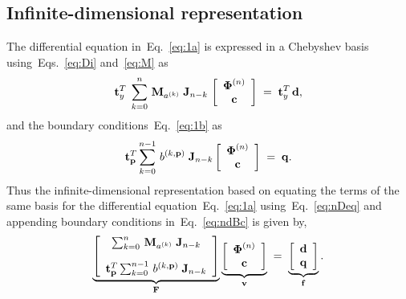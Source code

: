 \documentclass[%
secnumarabic,%
 amssymb, amsmath,%
 aps,prf,superscriptaddress,longbibliography
frontmatterverbose,
]{revtex4-2}
\begin{document}
\subsection{Infinite-dimensional representation}
The differential equation in~Eq.~\eqref{eq:1a} is expressed in a Chebyshev basis using~Eqs.~\eqref{eq:Di} and~\eqref{eq:M} as 
\begin{equation}\label{eq:nDeq}
  \mathbf{t}_{y}^T\;\sum_{k = 0}^{n}\, \mathbf M_{a^{(k)}}\; \mathbf{J}_{n-k}\,\left[\begin{array}{c}
    \boldsymbol \Phi^{(n)}\\ \mathbf{c} \end{array}\right] \;=\; \mathbf{t}_{y}^T\,\mathbf{d},
\end{equation}
and the boundary conditions~Eq.~\eqref{eq:1b} as
\begin{equation}\label{eq:ndBc}
  \mathbf{t}_{\mathbf{p}}^T\sum_{k = 0}^{n-1}\,b^{(k,\mathbf p)}\; \mathbf{J}_{n-k} \left[\begin{array}{c}
    \boldsymbol \Phi^{(n)}\\
    \mathbf{c}
  \end{array}\right]\;=\;\mathbf{q}.
\end{equation}
Thus the infinite-dimensional representation based on equating the terms of the same basis for the differential equation~Eq.~\eqref{eq:1a} using~Eq.~\eqref{eq:nDeq} and appending boundary conditions in~Eq.~\eqref{eq:ndBc} is given by,
\begin{equation}\label{eq:infiniteDim}
  \underbrace{\left[
  \begin{array}{cc}
    \sum_{k = 0}^{n}\, \mathbf M_{a^{(k)}}\; \mathbf{J}_{n-k}\\[1em]
    \mathbf{t}_{\mathbf{p}}^T\sum_{k = 0}^{n-1}\,b^{(k,\mathbf p)}\; \mathbf{J}_{n-k}
  \end{array}\right]}_{\mathbf{F}}\underbrace{\left[\begin{array}{c}
    \boldsymbol \Phi^{(n)}\\
    \mathbf{c}
  \end{array}\right]}_{\mathbf{v}} \;=\;\underbrace{\left[\begin{array}{c}
    \mathbf{d}\\
    \mathbf q
  \end{array}\right]}_{\mathbf{f}}.
\end{equation} 
\end{document}
